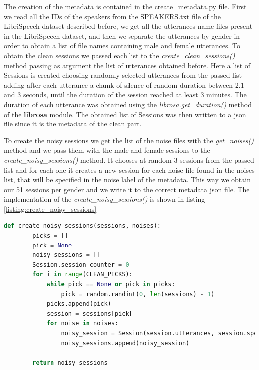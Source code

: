 \documentclass[../main.tex]{subfiles}
\begin{document}
The creation of the metadata is contained in the create\_metadata.py file. First we read all the IDs of the speakers from the SPEAKERS.txt file of the LibriSpeech dataset described before, we get all the utterances name files present in the LibriSpeech dataset, and then we separate the utterances by gender in order to obtain a list of file names containing male and female utterances. To obtain the clean sessions we passed each list to the \textit{create\_clean\_sessions()} method passing as argument the list of utterances obtained before. Here a list of Sessions is created choosing randomly selected utterances from the passed list adding after each utterance a chunk of silence of random duration between 2.1 and 3 seconds, until the duration of the session reached at least 3 minutes. The duration of each utterance was obtained using the \textit{librosa.get\_duration()} method of the \textbf{librosa} module. The obtained list of Sessions was then written to a json file since it is the metadata of the clean part. 

To create the noisy sessions we get the list of the noise files with the \textit{get\_noises()} method and we pass them with the male and female sessions to the \textit{create\_noisy\_sessions()} method. It chooses at random 3 sessions from the passed list and for each one it creates a new session for each noise file found in the noises list, that will be specified in the noise label of the metadata. This way we obtain our 51 sessions per gender and we write it to the correct metadata json file. The implementation of the \textit{create\_noisy\_sessions()} is shown in listing \ref{listing:create_noisy_sessions}

\begin{lstlisting}[language=Python, caption={create\_noisy\_sessions()}]
    def create_noisy_sessions(sessions, noises):
        picks = []
        pick = None
        noisy_sessions = []
        Session.session_counter = 0
        for i in range(CLEAN_PICKS):       
            while pick == None or pick in picks:
                pick = random.randint(0, len(sessions) - 1)
            picks.append(pick)
            session = sessions[pick]
            for noise in noises:
                noisy_session = Session(session.utterances, session.speech, noise, clean_session=session.id)
                noisy_sessions.append(noisy_session)
            
        return noisy_sessions
    \end{lstlisting}
    \label{listing:create_noisy_sessions}
\end{document}
